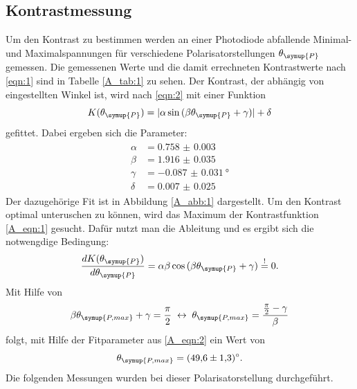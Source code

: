 \documentclass[
  bibliography=totoc,     %
  captions=tableheading,  %
  titlepage=firstiscover, %
]{scrartcl}
\begin{document}
\subsection{Kontrastmessung}
Um den Kontrast zu bestimmen werden an einer Photodiode abfallende
Minimal- und Maximalspannungen für verschiedene Polarisatorstellungen
$\theta_{\symup{P}}$ gemessen. Die gemessenen
Werte und die damit errechneten Kontrastwerte nach \eqref{eqn:1} sind in Tabelle \ref{A_tab:1}
zu sehen. Der Kontrast, der abhängig von eingestellten Winkel ist, wird nach
\eqref{eqn:2} mit einer Funktion
\begin{equation}
  K(\theta_{\symup{P}}) = |{\alpha \sin{(\beta \theta_{\symup{P}}+\gamma)}}| + \delta
  \label{A_eqn:1}
\end{equation}
gefittet. Dabei ergeben sich die Parameter:
\begin{align}
\begin{split}
  \alpha &= \num{0.758(3)}\\
  \beta &= \num{1.916(35)}\\
  \gamma &= \SI{-0.087(31)}{\degree} \\
  \delta &= \num{0.007(25)}
\end{split}
\label{A_eqn:2}
\end{align}
Der dazugehörige Fit ist in Abbildung \ref{A_abb:1} dargestellt. Um den Kontrast
optimal unteruschen zu können, wird das Maximum der Kontrastfunktion \eqref{A_eqn:1} gesucht.
Dafür nutzt man die Ableitung und es ergibt sich die notwengdige Bedingung:
\begin{equation*}
  \frac{dK(\theta_{\symup{P}})}{d\theta_{\symup{P}}} = \alpha \beta \cos{
  (\beta \theta_{\symup{P}} + \gamma)} \stackrel{!}{=} 0.
\end{equation*}
Mit Hilfe von
\begin{equation*}
  \beta \theta_{\symup{P, max}} + \gamma = \frac{\pi}{2} \; \leftrightarrow \;
  \theta_{\symup{P, max}} = \frac{\frac{\pi}{2} - \gamma}{\beta}
\end{equation*}
folgt, mit Hilfe der Fitparameter aus \eqref{A_eqn:2} ein Wert von
\begin{equation*}
  \theta_{\symup{P, max}} = \SI{49.6(13)}{\degree}.
\end{equation*}
Die folgenden Messungen wurden bei dieser Polarisatorstellung durchgeführt.
\end{document}
